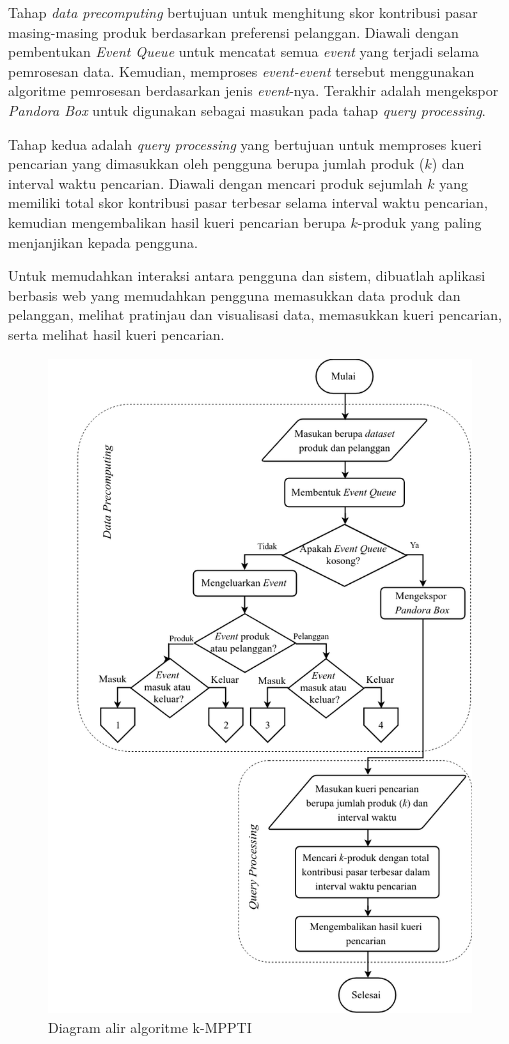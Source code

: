 Tahap \textit{data precomputing} bertujuan untuk menghitung skor kontribusi pasar masing-masing produk berdasarkan preferensi pelanggan. Diawali dengan pembentukan \textit{Event Queue} untuk mencatat semua \textit{event} yang terjadi selama pemrosesan data. Kemudian, memproses \textit{event-event} tersebut menggunakan algoritme pemrosesan berdasarkan jenis \textit{event}-nya. Terakhir adalah mengekspor \textit{Pandora Box} untuk digunakan sebagai masukan pada tahap \textit{query processing}.

Tahap kedua adalah \textit{query processing} yang bertujuan untuk memproses kueri pencarian yang dimasukkan oleh pengguna berupa jumlah produk ($k$) dan interval waktu pencarian. Diawali dengan mencari produk sejumlah $k$ yang memiliki total skor kontribusi pasar terbesar selama interval waktu pencarian, kemudian mengembalikan hasil kueri pencarian berupa $k$-produk yang paling menjanjikan kepada pengguna.

Untuk memudahkan interaksi antara pengguna dan sistem, dibuatlah aplikasi berbasis web yang memudahkan pengguna memasukkan data produk dan pelanggan, melihat pratinjau dan visualisasi data, memasukkan kueri pencarian, serta melihat hasil kueri pencarian.

\begin{figure}[H]
	\centering
	\includegraphics[width=10.5
	cm]{assets/img/bab3/flowchart.png}
	\caption{Diagram alir algoritme k-MPPTI}
	\label{fig:diagram-alur1}
\end{figure}

